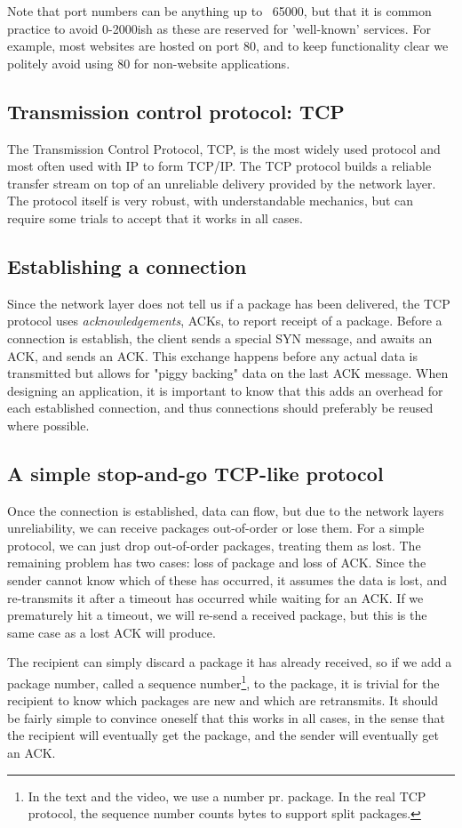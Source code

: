 Note that port numbers can be anything up to ~65000, but that it is common practice to avoid 0-2000ish as these are reserved for 'well-known' services. For example, most websites are hosted on port 80, and to keep functionality clear we politely avoid using 80 for non-website applications.

\subsection{Transmission control protocol: TCP}
The Transmission Control Protocol, TCP, is the most widely used protocol and most often used with IP to form TCP/IP. The TCP protocol builds a reliable transfer stream on top of an unreliable delivery provided by the network layer. The protocol itself is very robust, with understandable mechanics, but can require some trials to accept that it works in all cases.

\subsection{Establishing a connection}
Since the network layer does not tell us if a package has been delivered, the TCP protocol uses \emph{acknowledgements}, ACKs, to report receipt of a package. Before a connection is establish, the client sends a special SYN message, and awaits an ACK, and sends an ACK. This exchange happens before any actual data is transmitted but allows for "piggy backing" data on the last ACK message. When designing an application, it is important to know that this adds an overhead for each established connection, and thus connections should preferably be reused where possible. 

\subsection{A simple stop-and-go TCP-like protocol}
Once the connection is established, data can flow, but due to the network layers unreliability, we can receive packages out-of-order or lose them. For a simple protocol, we can just drop out-of-order packages, treating them as lost. The remaining problem has two cases: loss of package and loss of ACK. Since the sender cannot know which of these has occurred, it assumes the data is lost, and re-transmits it after a timeout has occurred while waiting for an ACK. If we prematurely hit a timeout, we will re-send a received package, but this is the same case as a lost ACK will produce.

The recipient can simply discard a package it has already received, so if we add a package number, called a sequence number\footnote{In the text and the video, we use a number pr. package. In the real TCP protocol, the sequence number counts bytes to support split packages.}, to the package, it is trivial for the recipient to know which packages are new and which are retransmits. It should be fairly simple to convince oneself that this works in all cases, in the sense that the recipient will eventually get the package, and the sender will eventually get an ACK.

